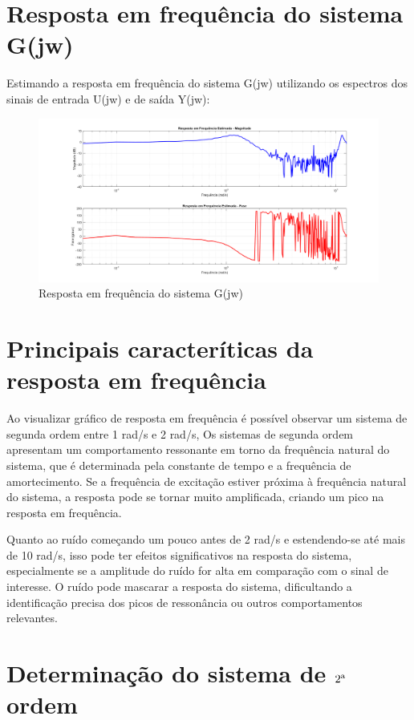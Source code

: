 \documentclass[10pt]{article}
\begin{document}
\section{Resposta em frequência do sistema G(jw)}

\quad Estimando a resposta em frequência do sistema G(jw) utilizando os espectros dos sinais
de entrada U(jw) e de saída Y(jw):

\begin{figure}[h]
    \centering
    \includegraphics[scale=0.34]{g.png}
    \caption{Resposta em frequência do sistema G(jw)}
\end{figure}

\section{Principais caracteríticas da resposta em frequência}

\quad Ao visualizar gráfico de resposta em frequência é possível observar um sistema de segunda ordem entre 1 rad/s e 2 rad/s,
Os sistemas de segunda ordem apresentam um comportamento ressonante em torno da frequência natural do sistema,
que é determinada pela constante de tempo e a frequência de amortecimento.
Se a frequência de excitação estiver próxima à frequência natural do sistema,
a resposta pode se tornar muito amplificada, criando um pico na resposta em frequência.

\quad Quanto ao ruído começando um pouco antes de 2 rad/s e estendendo-se até mais de 10 rad/s,
isso pode ter efeitos significativos na resposta do sistema,
especialmente se a amplitude do ruído for alta em comparação com o sinal de interesse.
O ruído pode mascarar a resposta do sistema,
dificultando a identificação precisa dos picos de ressonância ou
outros comportamentos relevantes.

\newpage

\section{Determinação do sistema de $2\textsuperscript{a}$ ordem}
\end{document}
